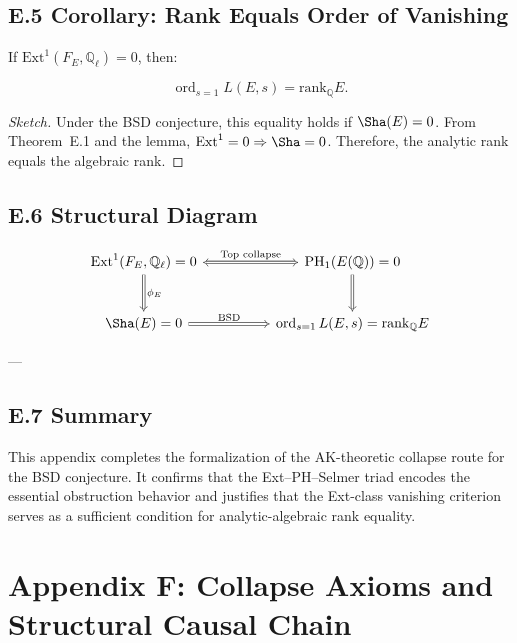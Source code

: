 \subsection*{E.5 Corollary: Rank Equals Order of Vanishing}

\begin{corollary}
If \( \mathrm{Ext}^1(F_E, \mathbb{Q}_\ell) = 0 \), then:

\[
\operatorname{ord}_{s=1}L(E, s) = \mathrm{rank}_{\mathbb{Q}} E.
\]
\end{corollary}

\begin{proof}[Sketch]
Under the BSD conjecture, this equality holds if \( \Sha(E) = 0 \).  
From Theorem~E.1 and the lemma, \( \mathrm{Ext}^1 = 0 \Rightarrow \Sha = 0 \).  
Therefore, the analytic rank equals the algebraic rank.
\end{proof}

\subsection*{E.6 Structural Diagram}

\[
\begin{tikzcd}[row sep=large, column sep=huge]
\mathrm{Ext}^1(F_E, \mathbb{Q}_\ell) = 0 \arrow[r, Leftrightarrow, "\text{Top collapse}"] \arrow[d, Rightarrow, "\phi_E"] & 
\mathrm{PH}_1(E(\mathbb{Q})) = 0 \arrow[d, Rightarrow] \\
\Sha(E) = 0 \arrow[r, Rightarrow, "\text{BSD}"] & \operatorname{ord}_{s=1}L(E,s) = \mathrm{rank}_\mathbb{Q}E
\end{tikzcd}
\]

---

\subsection*{E.7 Summary}

This appendix completes the formalization of the AK-theoretic collapse route for the BSD conjecture.  
It confirms that the Ext--PH--Selmer triad encodes the essential obstruction behavior and justifies  
that the Ext-class vanishing criterion serves as a sufficient condition for analytic-algebraic rank equality.



\section*{Appendix F: Collapse Axioms and Structural Causal Chain}

